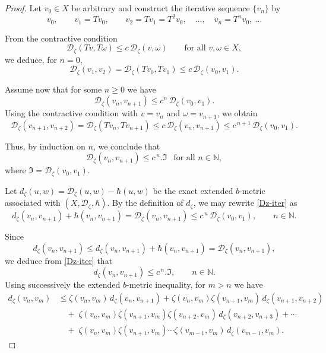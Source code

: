 \documentclass[10pt,a4paper]{amsart}
\begin{document}
\begin{proof}
Let $v_{0}\in X$ be arbitrary and construct the iterative sequence 
$\{v_{n}\}$ by
\[
v_{0}, \qquad v_{1}=T v_{0}, \qquad v_{2}=T v_{1}=T^{2}v_{0},\quad \dots,\quad 
v_{n}=T^{n}v_{0},\ \dots
\]

From the contractive condition
\[
\mathcal{D}_{\zeta}(T v,T \omega) \le c\,\mathcal{D}_{\zeta}(v,\omega)
\qquad \text{for all } v,\omega\in X,
\]
we deduce, for $n=0$,
\[
\mathcal{D}_{\zeta}(v_{1},v_{2})
= \mathcal{D}_{\zeta}(T v_{0},T v_{1})
\le c\,\mathcal{D}_{\zeta}(v_{0},v_{1}).
\]

Assume now that for some $n\ge0$ we have
\[
\mathcal{D}_{\zeta}(v_{n},v_{n+1})
\le c^{n}\,\mathcal{D}_{\zeta}(v_{0},v_{1}).
\]
Using the contractive condition with $v=v_{n}$ and $\omega=v_{n+1}$, we obtain
\[
\mathcal{D}_{\zeta}(v_{n+1},v_{n+2})
= \mathcal{D}_{\zeta}(T v_{n},T v_{n+1})
\le c\, \mathcal{D}_{\zeta}(v_{n},v_{n+1})
\le c^{\,n+1}\,\mathcal{D}_{\zeta}(v_{0},v_{1}).
\]

Thus, by induction on $n$, we conclude that
\begin{equation}\label{Dz-iter}
\mathcal{D}_{\zeta}(v_{n},v_{n+1})
\le c^{\,n}.\Im ~~\text{ for all } n\in\mathbb{N},
\end{equation}
where $\Im=\mathcal{D}_{\zeta}(v_{0},v_{1}).$


Let \(
d_{\zeta}(u,w)=\mathcal{D}_{\zeta}(u,w)-\hbar(u,w)
\)
be the exact extended $b$-metric associated with $(X,\mathcal{D}_{\zeta},\hbar)$.  By the definition of $d_{\zeta}$, we may rewrite \eqref{Dz-iter} as
\[
d_{\zeta}(v_n,v_{n+1}) + \hbar(v_n,v_{n+1})
= \mathcal{D}_{\zeta}(v_n,v_{n+1})
\le c^{\,n}\,\mathcal{D}_{\zeta}(v_0,v_1), \qquad n\in\mathbb{N}.
\]

Since
\[
d_{\zeta}(v_n,v_{n+1})
\le d_{\zeta}(v_n,v_{n+1})+\hbar(v_n,v_{n+1})
= \mathcal{D}_{\zeta}(v_n,v_{n+1}),
\]
we deduce from \eqref{Dz-iter} that
\begin{equation}\label{dz-final}
d_{\zeta}(v_n,v_{n+1})
\le c^{\,n}.\Im,
\qquad n\in\mathbb{N}.
\end{equation}
Using successively the extended $b$-metric inequality, for $m>n$ we have
\[
\begin{aligned}
d_{\zeta}(v_n , v_m)
&\le \zeta(v_n , v_m)\, d_{\zeta}(v_n , v_{n+1})
   + \zeta(v_n , v_m)\zeta(v_{n+1},v_m)\, d_{\zeta}(v_{n+1},v_{n+2})  \\
&\quad +\; \zeta(v_n , v_m)\zeta(v_{n+1},v_m)\zeta(v_{n+2},v_m)\,
          d_{\zeta}(v_{n+2},v_{n+3}) + \cdots \\
&\quad +\; \zeta(v_n , v_m)\zeta(v_{n+1},v_m)\cdots \zeta(v_{m-1},v_m)\,
          d_{\zeta}(v_{m-1},v_m).
\end{aligned}
\]


\end{proof}
\end{document}
